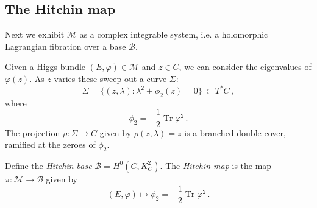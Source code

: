 \documentclass[12pt,letterpaper,reqno]{article}
\numberwithin{equation}{section}
\newcommand{\cB}{\ensuremath{\mathcal B}}
\newcommand{\cM}{\ensuremath{\mathcal M}}
\newcommand{\bbC}{\ensuremath{\mathbb C}}
\newcommand{\ti}[1]{\textit{#1}}
\DeclareMathOperator{\Tr}{Tr}
\DeclareMathOperator{\Jac}{Jac}
\DeclareMathOperator{\Tot}{Tot}
\newcommand{\SU}{\mathrm{SU}}
\newcommand{\U}{\mathrm{U}}
\begin{document}




\subsection{The Hitchin map}

Next we exhibit $\cM$ as a complex integrable system,
i.e. a holomorphic Lagrangian fibration over a base 
$\cB$.

Given a Higgs bundle $(E,\varphi) \in \cM$ and $z \in C$,
we can consider the eigenvalues of $\varphi(z)$. As $z$ varies
these sweep out a curve $\Sigma$:
\begin{equation}
  \Sigma = \{ (z,\lambda): \lambda^2 + \phi_2(z) = 0\} \, \subset T^*C \, ,
\end{equation}
where
\begin{equation}
  \phi_2 = - \frac12 \Tr \varphi^2 \, .
\end{equation}
The projection $\rho: \Sigma \to C$ given by $\rho(z,\lambda) = z$ is a branched double cover,
ramified at the zeroes of $\phi_2$.

\begin{defn}
Define the \ti{Hitchin base} $\cB = H^0(C, K_C^2)$.
The \ti{Hitchin map} is the map $\pi: \cM \to \cB$ given by
\begin{equation}
  (E, \varphi) \mapsto \phi_2 = - \frac12 \Tr \varphi^2 \, .
\end{equation}
\end{defn}
\end{document}
